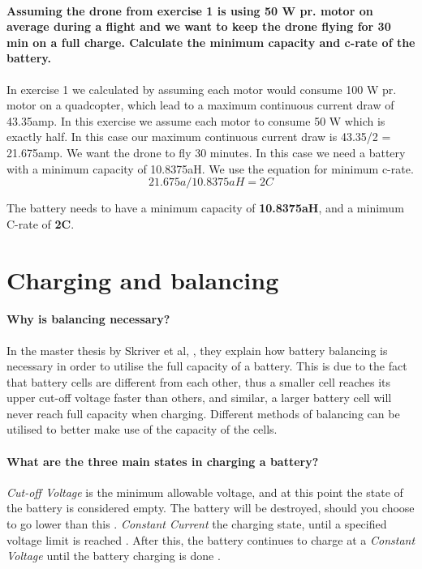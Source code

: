 \documentclass[paper=letter, fontsize=10pt]{article}
\begin{document}
\paragraph{Assuming the drone from exercise 1 is using 50 W pr. motor on average during a flight and we want to keep the drone flying for 30 min on a full charge. Calculate the minimum capacity and c-rate of the battery.}
In exercise 1 we calculated by assuming each motor would consume 100 W pr. motor on a quadcopter, which lead to a maximum continuous current draw of 43.35amp. In this exercise we assume each motor to consume 50 W which is exactly half. In this case our maximum continuous current draw is 43.35/2 = 21.675amp. We want the drone to fly 30 minutes. In this case we need a battery with a minimum capacity of 10.8375aH. We use the equation for minimum c-rate.
\[21.675a/10.8375aH = 2C\]

The battery needs to have a minimum capacity of \textbf{10.8375aH}, and a minimum C-rate of \textbf{2C}.

\section{Charging and balancing}

\paragraph{Why is balancing necessary?}
In the master thesis by Skriver et al, \cite{master_thesis}, they explain how battery balancing is necessary in order to utilise the full capacity of a battery. This is due to the fact that battery cells are different from each other, thus a smaller cell reaches its upper cut-off voltage faster than others, and similar, a larger battery cell will never reach full capacity when charging. Different methods of balancing can be utilised to better make use of the capacity of the cells. 

\paragraph{What are the three main states in charging a battery?}
\emph{Cut-off Voltage} is the minimum allowable voltage, and at this point the state of the battery is considered empty. The battery will be destroyed, should you choose to go lower than this \cite{understand_battery}.
\emph{Constant Current} the charging state, until a specified voltage limit is reached \cite{master_thesis}. After this, the battery continues to charge at a \emph{Constant Voltage} until the battery charging is done \cite{master_thesis}.
\end{document}
